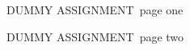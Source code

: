 \documentclass[a4paper]{article}
\begin{document}
\thispagestyle{empty}
\begin{center}\Huge DUMMY ASSIGNMENT\ page one\end{center}
\newpage
\thispagestyle{empty}
\begin{center}\Huge DUMMY ASSIGNMENT\ page two\end{center}
\end{document}
